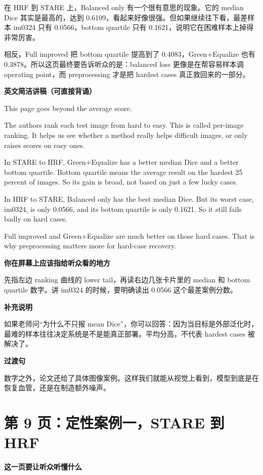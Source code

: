 \documentclass[12pt,a4paper]{ctexart}
\newcommand{\EnglishScriptHeading}{\textbf{\color{AccentGreen}英文简洁讲稿（可直接背诵）}}
\begin{document}
在 HRF 到 STARE 上，Balanced only 有一个很有意思的现象。它的 median Dice 其实是最高的，达到 0.6109，看起来好像很强。但如果继续往下看，最差样本 im0324 只有 0.0566，bottom quartile 只有 0.1621，说明它在困难样本上掉得非常厉害。

相反，Full improved 把 bottom quartile 提高到了 0.4083，Green+Equalize 也有 0.3878。所以这页最终要告诉听众的是：balanced loss 更像是在帮容易样本调 operating point，而 preprocessing 才是把 hardest cases 真正救回来的一部分。

\EnglishScriptHeading

This page goes beyond the average score.

The authors rank each test image from hard to easy. This is called per-image ranking. It helps us see whether a method really helps difficult images, or only raises scores on easy ones.

In STARE to HRF, Green+Equalize has a better median Dice and a better bottom quartile. Bottom quartile means the average result on the hardest 25 percent of images. So its gain is broad, not based on just a few lucky cases.

In HRF to STARE, Balanced only has the best median Dice. But its worst case, im0324, is only 0.0566, and its bottom quartile is only 0.1621. So it still fails badly on hard cases.

Full improved and Green+Equalize are much better on those hard cases. That is why preprocessing matters more for hard-case recovery.

\textbf{你在屏幕上应该指给听众看的地方}

先指左边 ranking 曲线的 lower tail，再读右边几张卡片里的 median 和 bottom quartile 数字。讲 im0324 的时候，要明确读出 0.0566 这个最差案例分数。

\textbf{补充说明}

如果老师问“为什么不只报 mean Dice”，你可以回答：因为当目标是外部泛化时，最难的样本往往决定系统是不是能真正部署。平均分高，不代表 hardest cases 被解决了。

\textbf{过渡句}

数字之外，论文还给了具体图像案例。这样我们就能从视觉上看到，模型到底是在恢复血管，还是在制造额外噪声。

\section*{第 9 页：定性案例一，STARE 到 HRF}

\textbf{这一页要让听众听懂什么}
\end{document}
